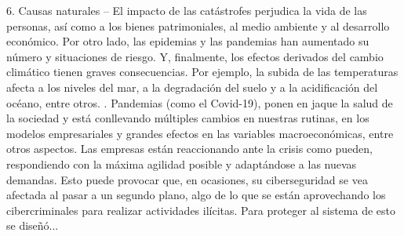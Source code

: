 \documentclass{article}
\begin{document}
6.  Causas naturales – El impacto de las catástrofes perjudica la vida de las personas, así como a los bienes patrimoniales, al medio ambiente y al desarrollo económico. Por otro lado, las epidemias y las pandemias han aumentado su número y situaciones de riesgo. Y, finalmente, los efectos derivados del cambio climático tienen graves consecuencias. Por ejemplo, la subida de las temperaturas afecta a los niveles del mar, a la degradación del suelo y a la acidificación del océano, entre otros. 
\newline
{}. Pandemias (como el Covid-19), ponen en jaque la salud de la sociedad y está conllevando múltiples cambios en nuestras rutinas, en los modelos empresariales y grandes efectos en las variables macroeconómicas, entre otros aspectos. Las empresas están reaccionando ante la crisis como pueden, respondiendo con la máxima agilidad posible y adaptándose a las nuevas demandas. Esto puede provocar que, en ocasiones, su ciberseguridad se vea afectada al pasar a un segundo plano, algo de lo que se están aprovechando los cibercriminales para realizar actividades ilícitas.
\newline
\newline
Para proteger al sistema de esto se diseñó...
\end{document}

